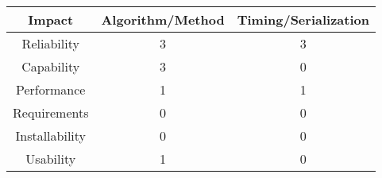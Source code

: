 \begin{table} [h]
  \begin{tabular}{c|c c}
    Impact & Algorithm/Method & Timing/Serialization \\
    \hline
    Reliability & 3 & 3 \\
    Capability & 3 & 0 \\
    Performance & 1 & 1 \\
    Requirements & 0 & 0 \\
    Installability & 0 & 0\\
    Usability & 1 & 0 \\
    \hline
  \end{tabular}
\end{table}

